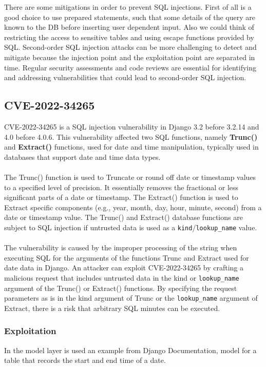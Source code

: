 \documentclass{article}
\begin{document}
	There are some mitigations in order to prevent SQL injections. First of all is a good choice to use prepared statements, such that some details of the query are known to the DB before inserting user dependent input. Also we could think of restricting the access to sensitive tables and using escape functions provided by SQL. Second-order SQL injection attacks can be more challenging to detect and mitigate because the injection point and the exploitation point are separated in time. Regular security assessments and code reviews are essential for identifying and addressing vulnerabilities that could lead to second-order SQL injection.
	\subsection{CVE-2022-34265}
	CVE-2022-34265 is a SQL injection vulnerability in Django 3.2 before 3.2.14 and 4.0 before 4.0.6. This vulnerability affected two SQL functions, namely \textbf{Trunc()} and \textbf{Extract()} functions, used for date and time manipulation, typically used in databases that support date and time data types.\\ \\
	The Trunc() function is used to Truncate or round off date or timestamp values to a specified level of precision. It essentially removes the fractional or less significant parts of a date or timestamp. The Extract() function is used to Extract specific components (e.g., year, month, day, hour, minute, second) from a date or timestamp value. The Trunc() and Extract() database functions are subject to SQL injection if untrusted data is used as a \verb|kind|/\verb|lookup_name| value. \\ \\
	 The vulnerability is caused by the improper processing of the string when executing SQL for the arguments of the functions Trunc and Extract 
	 used for date data in Django. An attacker can exploit CVE-2022-34265 by crafting a malicious request that includes untrusted data in the kind or 
	 \verb|lookup_name| argument of the Trunc() or Extract() functions. By specifying the request parameters as is in the kind argument of Trunc or the \verb|lookup_name| argument of Extract, there is a risk that arbitrary SQL minutes can be executed. 
	\subsubsection{Exploitation}
	In the model layer is used an example from Django Documentation, model for a table that records the start and end time of a date.
	
\end{document}
